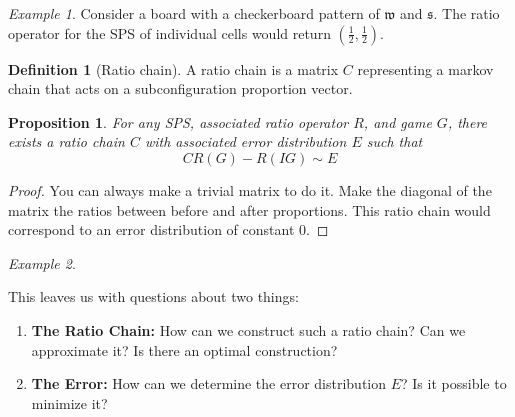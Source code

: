 \documentclass[12pt]{article}
\newtheorem{proposition}{Proposition}%
\theoremstyle{definition}
\newtheorem{definition}{Definition}%
\theoremstyle{remark}
\theoremstyle{remark}
\newtheorem{example}{Example}%
\begin{document}
\begin{example}
Consider a board with a checkerboard pattern of $\mathfrak{w}$ and $\mathfrak{s}$. The ratio operator for the SPS of individual cells would return $\left(\frac{1}{2},\frac{1}{2}\right)$.
\end{example} %

\begin{definition}[Ratio chain]
A ratio chain is a matrix $C$ representing a markov chain that acts on a subconfiguration proportion vector.
\end{definition}

\begin{proposition}
For any SPS, associated ratio operator $R$, and game $G$, there exists a ratio chain $C$ with associated error distribution $E$ such that
\begin{equation}
	CR\left(G\right)-R\left(IG\right) \sim E
\end{equation}

\end{proposition}
\begin{proof}
You can always make a trivial matrix to do it. Make the diagonal of the matrix the ratios between before and after proportions. This ratio chain would correspond to an error distribution of constant 0.	
\end{proof}
\begin{example}

\end{example}
This leaves us with questions about two things:
\begin{enumerate}
	\item{\textbf{The Ratio Chain:} How can we construct such a ratio chain? Can we approximate it? Is there an optimal construction?}
	\item{\textbf{The Error:} How can we determine the error distribution $E$? Is it possible to minimize it?}
\end{enumerate}
\end{document}
